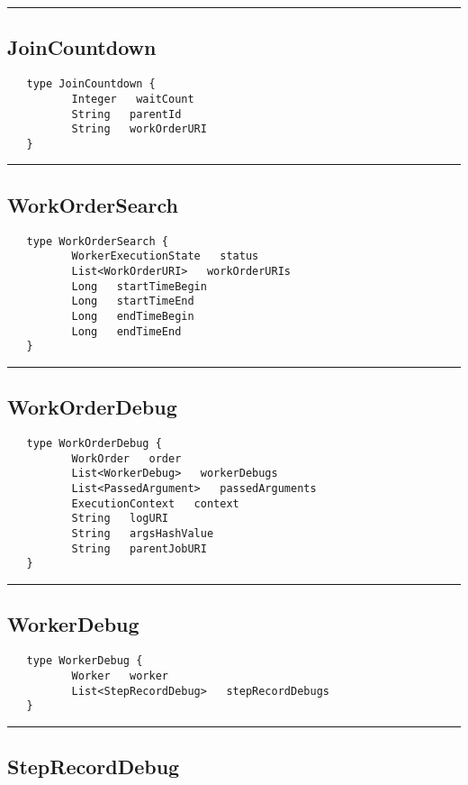 \rule{15cm}{2pt}
\subsection{JoinCountdown}
\label{type:JoinCountdown}

\begin{verbatim}
   type JoinCountdown {
          Integer   waitCount
          String   parentId
          String   workOrderURI
   }
\end{verbatim}

\rule{15cm}{2pt}
\subsection{WorkOrderSearch}
\label{type:WorkOrderSearch}

\begin{verbatim}
   type WorkOrderSearch {
          WorkerExecutionState   status
          List<WorkOrderURI>   workOrderURIs
          Long   startTimeBegin
          Long   startTimeEnd
          Long   endTimeBegin
          Long   endTimeEnd
   }
\end{verbatim}

\rule{15cm}{2pt}
\subsection{WorkOrderDebug}
\label{type:WorkOrderDebug}

\begin{verbatim}
   type WorkOrderDebug {
          WorkOrder   order
          List<WorkerDebug>   workerDebugs
          List<PassedArgument>   passedArguments
          ExecutionContext   context
          String   logURI
          String   argsHashValue
          String   parentJobURI
   }
\end{verbatim}

\rule{15cm}{2pt}
\subsection{WorkerDebug}
\label{type:WorkerDebug}

\begin{verbatim}
   type WorkerDebug {
          Worker   worker
          List<StepRecordDebug>   stepRecordDebugs
   }
\end{verbatim}

\rule{15cm}{2pt}
\subsection{StepRecordDebug}
\label{type:StepRecordDebug}

